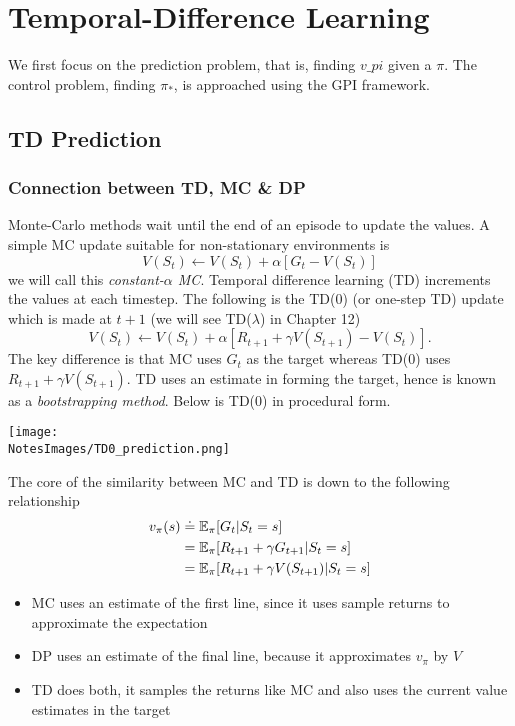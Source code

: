 \section{Temporal-Difference Learning}
We first focus on the prediction problem, that is, finding $v\_pi$ given a $\pi$. The control problem, finding $\pi_*$, is approached using the GPI framework.

\subsection{TD Prediction}

\subsubsection*{Connection between TD, MC \& DP}
Monte-Carlo methods wait until the end of an episode to update the values. A simple MC update suitable for non-stationary environments is
\begin{equation}
    V(S_t) \leftarrow V(S_t) + \alpha [G_t - V(S_t)]
\end{equation}
we will call this \emph{constant-$\alpha$ MC}. Temporal difference learning (TD) increments the values at each timestep. The following is the TD(0) (or one-step TD) update which is made at $t+1$ (we will see TD($\lambda$) in Chapter 12)
\begin{equation}
    V(S_t) \leftarrow V(S_t) + \alpha [R_{t+1} + \gamma V(S_{t+1}) - V(S_t)].
\end{equation}
The key difference is that MC uses $G_t$ as the target whereas TD(0) uses $R_{t+1} + \gamma V(S_{t+1})$. TD uses an estimate in forming the target, hence is known as a \emph{bootstrapping method}. Below is TD(0) in procedural form.

\texttt{[image: \\NotesImages/TD0\_prediction.png]}

The core of the similarity between MC and TD is down to the following relationship
\begin{align}
    v_\pi(s) &\doteq \mathbb{E}_\pi{}[G_t|S_t = s]\\
             &= \mathbb{E}_\pi{}[R_{t+1} + \gamma G_{t+1}|S_t = s]\\
             &= \mathbb{E}_\pi{}[R_{t+1} + \gamma V(S_{t+1})|S_t = s]
\end{align}

\begin{itemize}
    \item MC uses an estimate of the first line, since it uses sample returns to approximate the expectation
    \item DP uses an estimate of the final line, because it approximates $v_\pi$ by $V$
    \item TD does both, it samples the returns like MC and also uses the current value estimates in the target
\end{itemize}

